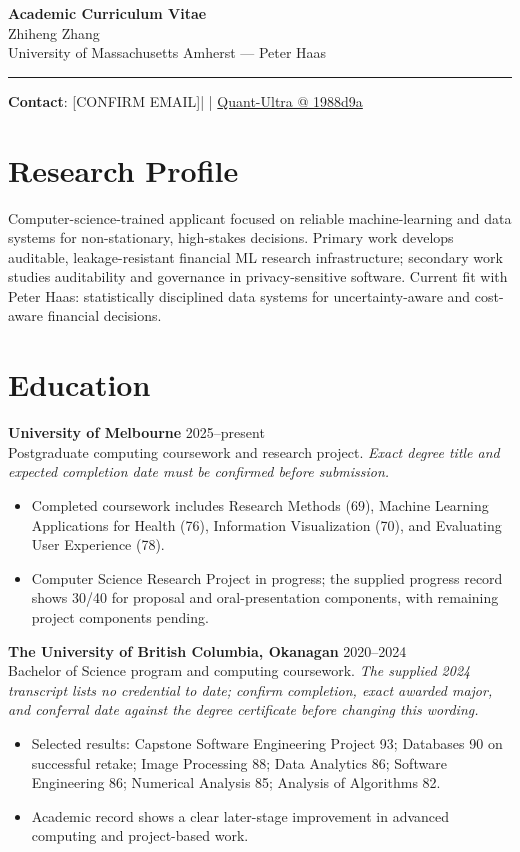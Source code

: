 \documentclass[11pt]{article}
\makeatletter
\newcommand{\ApplicantName}{Zhiheng Zhang}
\newcommand{\ApplicantEmail}{[CONFIRM EMAIL]}
\newcommand{\ApplicantPhone}{[CONFIRM PHONE]}
\newcommand{\ApplicantGitHub}{\href{https://github.com/zhiheng-zhang-Mera/Quant-Ultra/tree/1988d9a8530da91a8158de864d098ea869098923}{Quant-Ultra @ 1988d9a}}
\makeatother
\begin{document}
\begin{center}
{\LARGE\bfseries Academic Curriculum Vitae}\\[0.25em]
{\large \ApplicantName}\\
University of Massachusetts Amherst --- Peter Haas
\end{center}
\vspace{0.35em}\hrule\vspace{0.65em}

\textbf{Contact}: \ApplicantEmail\quad | \quad \ApplicantPhone\quad | \quad \ApplicantGitHub

\section*{Research Profile}
Computer-science-trained applicant focused on reliable machine-learning and data systems for non-stationary, high-stakes decisions. Primary work develops auditable, leakage-resistant financial ML research infrastructure; secondary work studies auditability and governance in privacy-sensitive software. Current fit with Peter Haas: statistically disciplined data systems for uncertainty-aware and cost-aware financial decisions.

\section*{Education}
\textbf{University of Melbourne} \hfill 2025--present\\
Postgraduate computing coursework and research project. \textit{Exact degree title and expected completion date must be confirmed before submission.}
\begin{itemize}
\item Completed coursework includes Research Methods (69), Machine Learning Applications for Health (76), Information Visualization (70), and Evaluating User Experience (78).
\item Computer Science Research Project in progress; the supplied progress record shows 30/40 for proposal and oral-presentation components, with remaining project components pending.
\end{itemize}

\textbf{The University of British Columbia, Okanagan} \hfill 2020--2024\\
Bachelor of Science program and computing coursework. \textit{The supplied 2024 transcript lists no credential to date; confirm completion, exact awarded major, and conferral date against the degree certificate before changing this wording.}
\begin{itemize}
\item Selected results: Capstone Software Engineering Project 93; Databases 90 on successful retake; Image Processing 88; Data Analytics 86; Software Engineering 86; Numerical Analysis 85; Analysis of Algorithms 82.
\item Academic record shows a clear later-stage improvement in advanced computing and project-based work.
\end{itemize}
\end{document}
